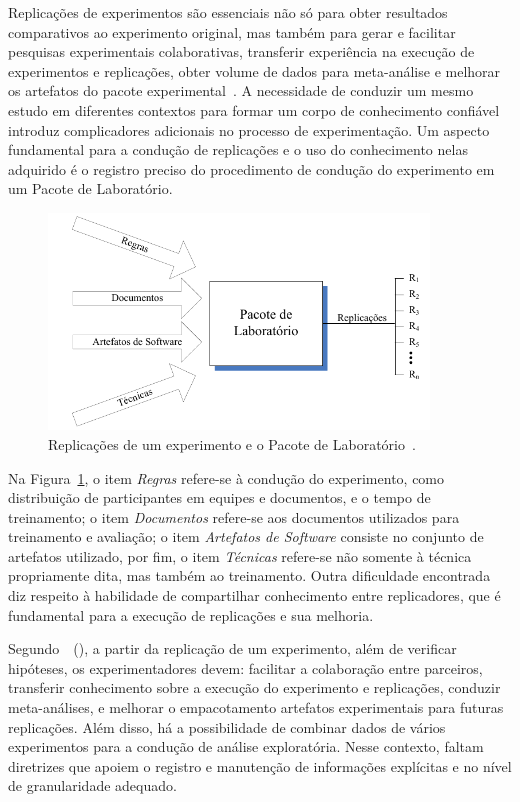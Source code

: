 Replicações de experimentos são essenciais não só para obter resultados comparativos ao experimento original, mas também para gerar e facilitar pesquisas experimentais colaborativas, transferir experiência na execução de experimentos e replicações, obter volume de dados para meta-análise e melhorar os artefatos do pacote experimental~\cite{Shull02, maldonado2006perspective}. A necessidade de conduzir um mesmo estudo em diferentes contextos para formar um corpo de conhecimento confiável introduz complicadores adicionais no processo de experimentação. Um aspecto fundamental para a condução de replicações e o uso do conhecimento nelas adquirido é o registro preciso do procedimento de condução do experimento em um Pacote de Laboratório.

\begin{figure}[!htb]
\centering
\includegraphics[width=0.9\textwidth]{images/replicacao.png}
\caption{Replicações de um experimento e o Pacote de Laboratório~\cite{Garcia06}.}
\label{image:replicacao}
\end{figure}

Na Figura~\ref{image:replicacao}, o item \textit{Regras} refere-se à condução do experimento, como distribuição de participantes em equipes e documentos, e o tempo de treinamento; o item \textit{Documentos} refere-se aos documentos utilizados para treinamento e avaliação; o item \textit{Artefatos de Software} consiste no conjunto de artefatos utilizado, por fim, o item \textit{Técnicas} refere-se não somente à técnica propriamente dita, mas também ao treinamento. Outra dificuldade encontrada diz respeito à habilidade de compartilhar conhecimento entre replicadores, que é fundamental para a execução de replicações e sua melhoria. 

Segundo~~(\citeyear{Shull02}), a partir da replicação de um experimento, além de verificar hipóteses, os experimentadores devem: facilitar a colaboração entre parceiros, transferir conhecimento sobre a execução do experimento e replicações, conduzir meta-análises, e melhorar o empacotamento artefatos experimentais para futuras replicações. Além disso, há a possibilidade de combinar dados de vários experimentos para a condução de análise exploratória. Nesse contexto, faltam diretrizes que apoiem o registro e manutenção de informações explícitas e no nível de granularidade adequado.

